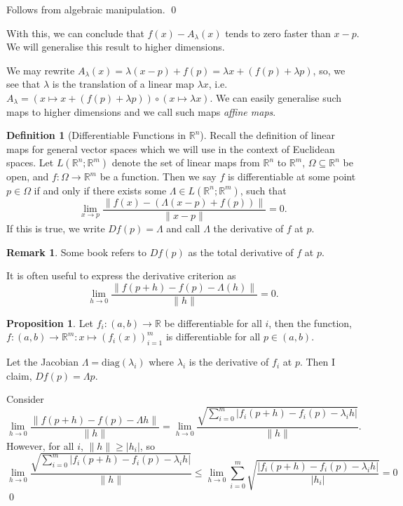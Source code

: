 \documentclass[
]{article}
\theoremstyle{definition}
\newtheorem{prop}{Proposition}
\newtheorem*{remark}{Remark}
\theoremstyle{definition}
\newtheorem{definition}{Definition}[section]
\begin{document}
Follows from algebraic manipulation. \qed

With this, we can conclude that \(f(x) - A_\lambda(x)\) tends to zero
faster than \(x - p\). We will generalise this result to higher
dimensions.

We may rewrite
\(A_\lambda(x) = \lambda(x - p) + f(p) = \lambda x + (f(p) + \lambda p)\),
so, we see that \(\lambda\) is the translation of a linear map
\(\lambda x\),
i.e.~\(A_\lambda = (x \mapsto x + (f(p) + \lambda p)) \circ (x \mapsto \lambda x)\).
We can easily generalise such maps to higher dimensions and we call such
maps \emph{affine maps}.

\begin{definition}[Differentiable Functions in \(\mathbb{R}^n\)]
  Recall the definition of linear maps for general vector spaces which we will 
  use in the context of Euclidean spaces. Let \(L(\mathbb{R}^n; \mathbb{R}^m)\) 
  denote the set of linear maps from \(\mathbb{R}^n\) to \(\mathbb{R}^m\), 
  \(\Omega \subseteq \mathbb{R}^n\) be open, and \(f : \Omega \to \mathbb{R}^m\) 
  be a function. Then we say \(f\) is differentiable at some point 
  \(p \in \Omega\) if and only if there exists some 
  \(\Lambda \in L(\mathbb{R}^n; \mathbb{R}^m)\), such that 
  \[ \lim_{x \to p} \frac{\| f(x) - (\Lambda(x - p) + f(p))\|}{\|x - p\|} = 0.
  \]
  If this is true, we write \(Df(p) = \Lambda\) and call \(\Lambda\) the 
  derivative of \(f\) at \(p\).
\end{definition}
\begin{remark}
  Some book refers to \(Df(p)\) as the total derivative of \(f\) at \(p\).
\end{remark}

It is often useful to express the derivative criterion as
\[\lim_{h \to 0} \frac{\|f(p + h) - f(p) - \Lambda(h)\|}{\| h \|} = 0.\]

\begin{prop}
  Let \(f_i : (a, b) \to \mathbb{R}\) be differentiable for all \(i\), then the 
  function, \(f : (a, b) \to \mathbb{R}^m : x \mapsto (f_i(x))_{i = 1}^m\) is 
  differentiable for all \(p \in (a, b)\).
\end{prop}
\proof

Let the Jacobian \(\Lambda = \text{diag}(\lambda_i)\) where
\(\lambda_i\) is the derivative of \(f_i\) at \(p\). Then I claim,
\(Df(p) = \Lambda p\).

Consider
\[\lim_{h \to 0} \frac{\|f(p + h) - f(p) - \Lambda h\|}{\| h \|} = 
  \lim_{h \to 0} \frac{\sqrt{\sum_{i = 0}^m \left|f_i(p + h) - f_i(p) - \lambda_i h\right|}}
  {\| h \|}.\] However, for all \(i\),
\(\| h \| \ge \left| h_i \right|\), so \[ \lim_{h \to 0}
  \frac{\sqrt{\sum_{i = 0}^m \left|f_i(p + h) - f_i(p) - \lambda_i h\right|}}
  {\| h \|} \le \lim_{h \to 0} \sum_{i = 0}^m
  \sqrt{\frac{\left|f_i(p + h) - f_i(p) - \lambda_i h\right|}
  {\left| h_i \right|}} = 0\] \qed
\end{document}

